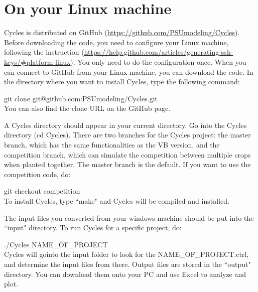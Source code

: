 \documentclass[11pt]{article}
\begin{document}
\section{On your Linux machine}
Cycles is distributed on GitHub (\url{https://github.com/PSUmodeling/Cycles}).
Before downloading the code, you need to configure your Linux machine, following the instruction (\url{https://help.github.com/articles/generating-ssh-keys/#platform-linux}).
You only need to do the configuration once.
When you can connect to GitHub from your Linux machine, you can download the code.
In the directory where you want to install Cycles, type the following command:

git clone git@github.com:PSUmodeling/Cycles.git\\
You can also find the clone URL on the GitHub page.

A Cycles directory should appear in your current directory.
Go into the Cycles directory (cd Cycles).
There are two branches for the Cycles project:
the master branch, which has the same functionalities as the VB version, and the competition branch, which can simulate the competition between multiple crops when planted together.
The master branch is the default.
If you want to use the competition code, do:

git checkout competition\\
To install Cycles, type ``make" and Cycles will be compiled and installed.

The input files you converted from your windows machine should be put into the ``input" directory.
To run Cycles for a specific project, do:

./Cycles NAME\_OF\_PROJECT\\
Cycles will gointo the input folder to look for the NAME\_OF\_PROJECT.ctrl, and determine the input files from there.
Output files are stored in the ``output" directory.
You can download them onto your PC and use Excel to analyze and plot.
\end{document}
